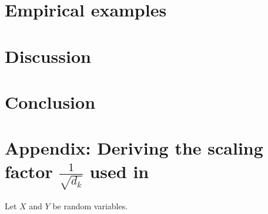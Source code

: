 \documentclass{article}
\theoremstyle{plain}
\theoremstyle{plain} %
\theoremstyle{definition}  %
\theoremstyle{remark}  %
\theoremstyle{plain}
\begin{document}
\begin{tikzpicture}[node distance=0.2cm]
\end{tikzpicture}

\section{Empirical examples}
\section{Discussion}
\section{Conclusion}

\section{Appendix: Deriving the scaling factor $\frac{1}{\sqrt{d_k}}$ used in \cite{vaswani2017attention}}

Let $X$ and $Y$ be random variables.
\end{document}
